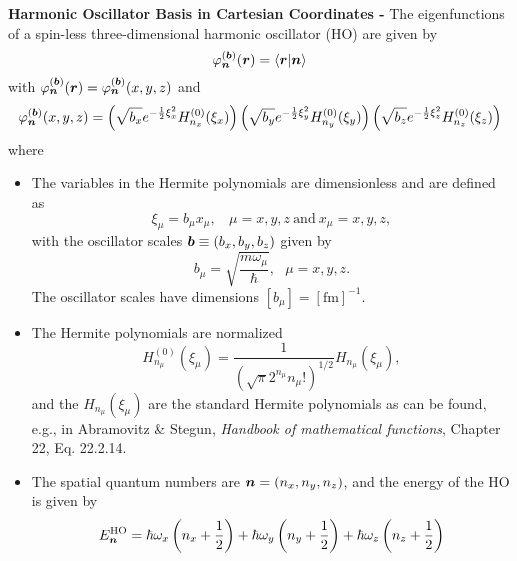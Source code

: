 {\bf Harmonic Oscillator Basis in Cartesian Coordinates - } The eigenfunctions 
of a spin-less three-dimensional harmonic oscillator (HO) are given by
\begin{equation}
\varphi^{(\boldsymbol{b})}_{\boldsymbol{n}}(\boldsymbol{r}) = \langle \boldsymbol{r} | \boldsymbol{n} \rangle
\end{equation}
with $\varphi^{(\boldsymbol{b})}_{\boldsymbol{n}}(\boldsymbol{r}) = 
\varphi^{(\boldsymbol{b})}_{\boldsymbol{n}}(x,y,z)$ and
\begin{equation}
\varphi^{(\boldsymbol{b})}_{\boldsymbol{n}}(x,y,z) =
\left(\sqrt{b_{x}}e^{-\frac{1}{2}\xi_{x}^{2}}H^{(0)}_{n_{x}}(\xi_{x})\right)
\left(\sqrt{b_{y}}e^{-\frac{1}{2}\xi_{y}^{2}}H^{(0)}_{n_{y}}(\xi_{y})\right)
\left(\sqrt{b_{z}}e^{-\frac{1}{2}\xi_{z}^{2}}H^{(0)}_{n_{z}}(\xi_{z})\right)
\label{HO-3D}
\end{equation}
where
\begin{itemize}
\item The variables in the Hermite polynomials are dimensionless and are 
defined as
\begin{equation}
\xi_{\mu} = b_{\mu}x_{\mu},\ \ \ \ \mu=x,y,z\ \text{and}\ x_{\mu} = x,y,z,
\end{equation}
with the oscillator scales $\boldsymbol{b} \equiv (b_{x},b_{y}, b_{z}) $ given by
\begin{equation}
b_{\mu} = \sqrt{\frac{m\omega_{\mu}}{\hbar}},\ \ \ \mu = x,y,z.
\end{equation}
The oscillator scales have dimensions $[ b_{\mu} ] = [\text{fm}]^{-1}$.
\item The Hermite polynomials are normalized
\begin{equation}
H^{(0)}_{n_{\mu}}(\xi_{\mu}) =
\frac{1}{\left( \sqrt{\pi}2^{n_{\mu}}n_{\mu}! \right)^{1/2} }H_{n_{\mu}}(\xi_{\mu}),
\end{equation}
and the $H_{n_{\mu}}(\xi_{\mu})$ are the standard Hermite polynomials as can be 
found, e.g., in Abramovitz \& Stegun, {\em Handbook of mathematical functions}, 
Chapter 22, Eq. 22.2.14. 
\item The spatial quantum numbers are $\boldsymbol{n} = ( n_{x}, n_{y}, n_{z})$, and 
the energy of the HO is given by
\begin{equation}
E^{\text{HO}}_{\boldsymbol{n}} = 
\hbar\omega_{x}\left( n_{x} + \frac{1}{2} \right)
+
\hbar\omega_{y}\left( n_{y} + \frac{1}{2} \right)
+
\hbar\omega_{z}\left( n_{z} + \frac{1}{2} \right)
\end{equation}
\end{itemize}

